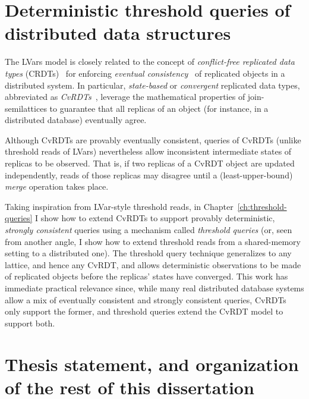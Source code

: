 \section{Deterministic threshold queries of distributed data structures}\label{s:intro-cvrdts}

The LVars model is closely related to the concept of
\emph{conflict-free replicated data types} (CRDTs)~\cite{crdts} for
enforcing \emph{eventual consistency}~\cite{vogels-ec} of replicated
objects in a distributed system.  In particular, \emph{state-based} or
\emph{convergent} replicated data types, abbreviated as
\emph{CvRDTs}~\cite{crdts, crdts-tr}, leverage the mathematical
properties of join-semilattices to guarantee that all replicas of an
object (for instance, in a distributed database) eventually agree.

Although CvRDTs are provably eventually consistent, queries of CvRDTs
(unlike threshold reads of LVars) nevertheless allow inconsistent
intermediate states of replicas to be observed.  That is, if two
replicas of a CvRDT object are updated independently, reads of those
replicas may disagree until a (least-upper-bound) \emph{merge}
operation takes place.

Taking inspiration from LVar-style threshold reads, in
Chapter~\ref{ch:threshold-queries} I show how to extend CvRDTs to
support provably deterministic, \emph{strongly consistent} queries
using a mechanism called \emph{threshold queries} (or, seen from
another angle, I show how to extend threshold reads from a
shared-memory setting to a distributed one).  The threshold query
technique generalizes to any lattice, and hence any CvRDT, and allows
deterministic observations to be made of replicated objects before the
replicas' states have converged.  This work has immediate practical
relevance since, while many real distributed database systems allow a
mix of eventually consistent and strongly consistent queries, CvRDTs
only support the former, and threshold queries extend the CvRDT model
to support both.

\section{Thesis statement, and organization of the rest of this dissertation}\label{s:thesis}


